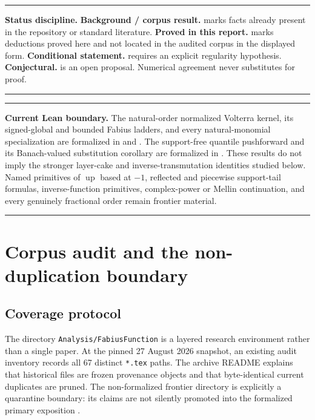 \documentclass[11pt,oneside]{article}
\numberwithin{equation}{section}
\theoremstyle{definition}
\theoremstyle{remark}
\newcommand{\Up}{\operatorname{up}}
\newcommand{\repo}{\nolinkurl{Analysis/FabiusFunction}}
\newcommand{\statusbackground}{\textcolor{linkblue}{\textbf{Background / corpus result.}}}
\newcommand{\statusproved}{\textcolor{proofgreen}{\textbf{Proved in this report.}}}
\newcommand{\statusconditional}{\textcolor{conditionalorange}{\textbf{Conditional statement.}}}
\newcommand{\statusconjecture}{\textcolor{conjecturered}{\textbf{Conjectural.}}}
\newenvironment{statusbox}{%
  \par\smallskip\noindent\begin{center}\begin{minipage}{0.94\textwidth}%
  \hrule\vspace{0.65em}\small
}{%
  \vspace{0.65em}\hrule\end{minipage}\end{center}\smallskip
}
\begin{document}
\begin{statusbox}
\textbf{Status discipline.}
\statusbackground{} marks facts already present in the repository or standard
literature.  \statusproved{} marks deductions proved here and not located in the
audited corpus in the displayed form.  \statusconditional{} requires an explicit
regularity hypothesis.  \statusconjecture{} is an open proposal.  Numerical
agreement never substitutes for proof.
\end{statusbox}

\begin{statusbox}
\textbf{Current Lean boundary.}
The natural-order normalized Volterra kernel, its signed-global and bounded
Fabius ladders, and every natural-monomial specialization are formalized in
 and .
The support-free quantile pushforward and its Banach-valued substitution
corollary are formalized in .  These results do
not imply the stronger layer-cake and inverse-transmutation identities studied
below.  Named primitives of \(\Up\) based at \(-1\), reflected and piecewise
support-tail formulas, inverse-function primitives, complex-power or Mellin
continuation, and every genuinely fractional order remain frontier material.
\end{statusbox}

\tableofcontents
\clearpage

\section{Corpus audit and the non-duplication boundary}
\label{sec:audit}

\subsection{Coverage protocol}

The directory \repo{} is a layered research environment rather than a single
paper.  At the pinned 27 August 2026 snapshot, an existing audit inventory
records all 67 distinct \texttt{*.tex} paths.  The archive README explains that
historical files are frozen provenance objects and that byte-identical current
duplicates are pruned.  The non-formalized frontier directory is explicitly a
quarantine boundary: its claims are not silently promoted into the formalized
primary exposition \cite{proveitArchive,proveitFrontierReadme,proveitNewton}.
\end{document}
